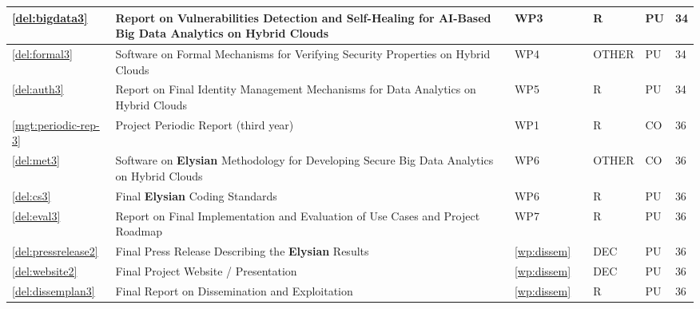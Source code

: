 \documentclass[a4paper,11pt]{article}
\newcommand{\project}[1]{\textbf{#1}\xspace}
\newcommand{\SECURITY}{\project{Elysian}}
\newcommand{\TheProject}{\SECURITY}
\begin{document}
\begin{minipage}{\textwidth}
\begin{center}
\begin{tabular}{|p{0.8cm}|p{9.65cm}|p{0.8cm}|p{1.15cm}|p{1.2cm}|p{0.8cm}|p{0.8cm}|}
\hline \ref{del:bigdata3} & Report on Vulnerabilities Detection and Self-Healing for AI-Based Big Data Analytics on Hybrid Clouds & WP3 & \SCCHshort{} & R & PU & 34 \\
\hline \ref{del:formal3} & Software on Formal Mechanisms for Verifying Security Properties on Hybrid Clouds & WP4 & \SAshort{} & OTHER & PU & 34 \\
\hline \ref{del:auth3} & Report on Final Identity Management Mechanisms for Data Analytics on Hybrid Clouds & WP5 & \COGNIshort{} & R & PU & 34 \\
\hline \ref{mgt:periodic-rep-3} & Project Periodic Report (third year) & WP1 & \coordshort{} & R & CO & 36 \\
\hline \ref{del:met3} & Software on \TheProject{} Methodology for Developing Secure Big Data Analytics on Hybrid Clouds & WP6 & \COGNIshort{} & OTHER & CO & 36 \\
\hline \ref{del:cs3} & Final \TheProject{} Coding Standards & WP6 & \UCMshort{} & R & PU & 36 \\
\hline \ref{del:eval3} & Report on Final Implementation and Evaluation of Use Cases and Project Roadmap & WP7 & \FRQshort{} & R & PU & 36 \\
\hline \ref{del:pressrelease2} & Final Press Release Describing the \TheProject{} Results & \ref{wp:dissem} & \SAshort{} & DEC & PU & 36 \\
\hline \ref{del:website2} & Final Project Website / Presentation & \ref{wp:dissem} & \UODshort{} & DEC & PU & 36 \\
\hline \ref{del:dissemplan3} & Final Report on Dissemination and Exploitation & \ref{wp:dissem} & \UODshort{} & R & PU &  36 \\

\hline
\end{tabular}
\end{center}
\end{minipage}




%



\bigskip\bigskip\bigskip
\pagebreak
{}
\end{document}
